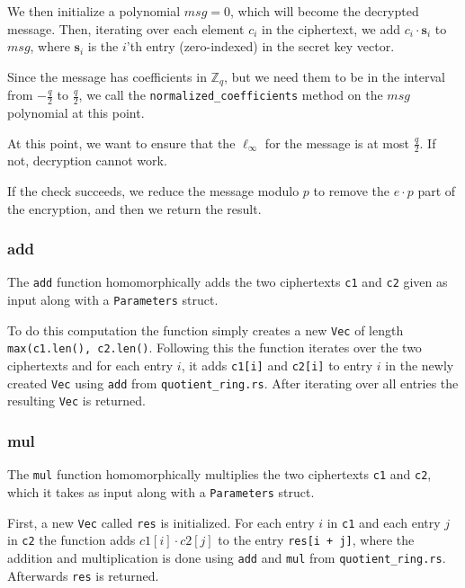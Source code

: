 \documentclass[../main.tex]{subfiles}
\begin{document}
We then initialize a polynomial $msg = 0$, which will become the decrypted message.
Then, iterating over each element $c_i$ in the ciphertext, we add $c_i \cdot \mathbf{s}_i$ to $msg$, where $\mathbf{s}_i$ is the $i$'th entry (zero-indexed) in the secret key vector.

Since the message has coefficients in $\mathbb{Z}_q$, but we need them to be in the interval from $-\frac{q}{2}$ to $\frac{q}{2}$, we call the \lstinline{normalized_coefficients} method on the $msg$ polynomial at this point.

At this point, we want to ensure that the $\ell_\infty$ for the message is at most $\frac{q}{2}$.
If not, decryption cannot work.

If the check succeeds, we reduce the message modulo $p$ to remove the $e \cdot p$ part of the encryption, and then we return the result.

\subsubsection{add}
The \lstinline{add} function homomorphically adds the two ciphertexts \lstinline{c1} and \lstinline{c2} given as input along with a \lstinline{Parameters} struct.

To do this computation the function simply creates a new \lstinline{Vec} of length \lstinline{max(c1.len(), c2.len()}.
Following this the function iterates over the two ciphertexts and for each entry $i$, it adds \lstinline{c1[i]} and \lstinline{c2[i]} to entry $i$ in the newly created \lstinline{Vec} using \lstinline{add} from \lstinline{quotient_ring.rs}. After iterating over all entries the resulting \lstinline{Vec} is returned.

\subsubsection{mul}
The \lstinline{mul} function homomorphically multiplies the two ciphertexts \lstinline{c1} and \lstinline{c2}, which it takes as input along with a \lstinline{Parameters} struct.

First, a new \lstinline{Vec} called \lstinline{res} is initialized.
For each entry $i$ in \lstinline{c1} and each entry $j$ in \lstinline{c2} the function adds $c1[i] \cdot c2[j]$ to the entry \lstinline{res[i + j]}, where the addition and multiplication is done using \lstinline{add} and \lstinline{mul} from \lstinline{quotient_ring.rs}.
Afterwards \lstinline{res} is returned.
\end{document}
